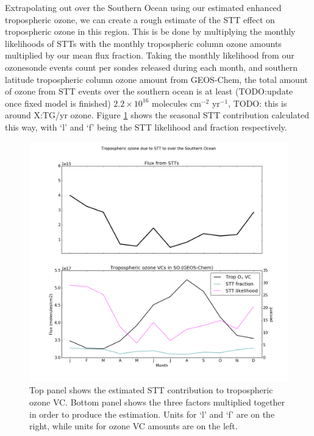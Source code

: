 \documentclass{article}
\begin{document}
  Extrapolating out over the Southern Ocean using our estimated enhanced tropospheric ozone, we can create a rough estimate of the STT effect on tropospheric ozone in this region.
  This is be done by multiplying the monthly likelihoods of STTs with the monthly tropospheric column ozone amounts multiplied by our mean flux fraction.
  Taking the monthly likelihood from our ozonesonde events count per sondes released during each month, and southern latitude tropospheric column ozone amount from GEOS-Chem, the total amount of ozone from STT events over the southern ocean is at least (TODO:update once fixed model is finished) $2.2\times10^{16}$ molecules cm$^{-2}$ yr$^{-1}$, TODO: this is around X:TG/yr ozone.
  Figure \ref{fig:SOExtrapolation} shows the seasonal STT contribution calculated this way, with `l' and `f' being the STT likelihood and fraction respectively.
    
  \begin{figure}[!htbp]
    \includegraphics[width=\textwidth]{figures/SO_extrapolation.png}
    \caption{Top panel shows the estimated STT contribution to tropospheric ozone VC. Bottom panel shows the three factors multiplied together in order to produce the estimation. Units for `l' and `f' are on the right, while units for ozone VC amounts are on the left.}
    \label{fig:SOExtrapolation}
  \end{figure}
  
\end{document}

